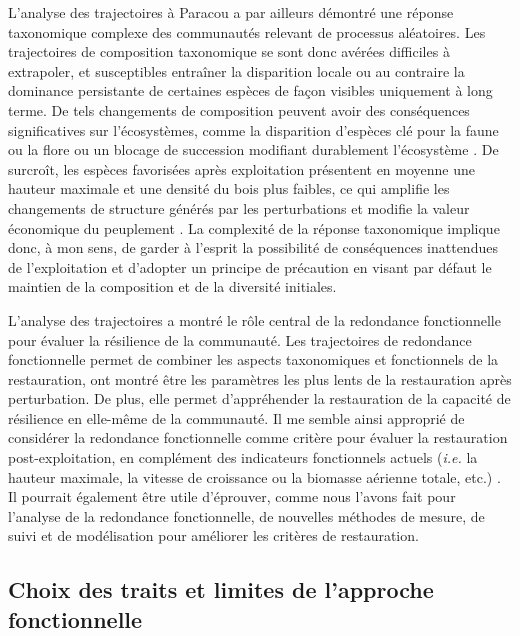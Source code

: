 \documentclass[
  11pt,
  french,
  A4paper,
  extrafontsizes,onecolumn,openright
  ]{memoir}
\begin{document}
L'analyse des trajectoires à Paracou a par ailleurs démontré une réponse
taxonomique complexe des communautés relevant de processus aléatoires.
Les trajectoires de composition taxonomique se sont donc avérées
difficiles à extrapoler, et susceptibles entraîner la disparition locale
ou au contraire la dominance persistante de certaines espèces de façon
visibles uniquement à long terme. De tels changements de composition
peuvent avoir des conséquences significatives sur l'écosystèmes, comme
la disparition d'espèces clé pour la faune ou la flore ou un blocage de
succession modifiant durablement l'écosystème \autocite{Diaz2005}. De
surcroît, les espèces favorisées après exploitation présentent en
moyenne une hauteur maximale et une densité du bois plus faibles, ce qui
amplifie les changements de structure générés par les perturbations et
modifie la valeur économique du peuplement \autocite{Reich2014}. La
complexité de la réponse taxonomique implique donc, à mon sens, de
garder à l'esprit la possibilité de conséquences inattendues de
l'exploitation et d'adopter un principe de précaution en visant par
défaut le maintien de la composition et de la diversité initiales.

L'analyse des trajectoires a montré le rôle central de la redondance
fonctionnelle pour évaluer la résilience de la communauté. Les
trajectoires de redondance fonctionnelle permet de combiner les aspects
taxonomiques et fonctionnels de la restauration, ont montré être les
paramètres les plus lents de la restauration après perturbation. De
plus, elle permet d'appréhender la restauration de la capacité de
résilience en elle-même de la communauté. Il me semble ainsi approprié
de considérer la redondance fonctionnelle comme critère pour évaluer la
restauration post-exploitation, en complément des indicateurs
fonctionnels actuels (\emph{i.e.} la hauteur maximale, la vitesse de
croissance ou la biomasse aérienne totale, etc.) \autocite{Sist2015}. Il
pourrait également être utile d'éprouver, comme nous l'avons fait pour
l'analyse de la redondance fonctionnelle, de nouvelles méthodes de
mesure, de suivi et de modélisation pour améliorer les critères de
restauration.

\subsection{Choix des traits et limites de l'approche
fonctionnelle}\label{choix-des-traits-et-limites-de-lapproche-fonctionnelle}
\end{document}
